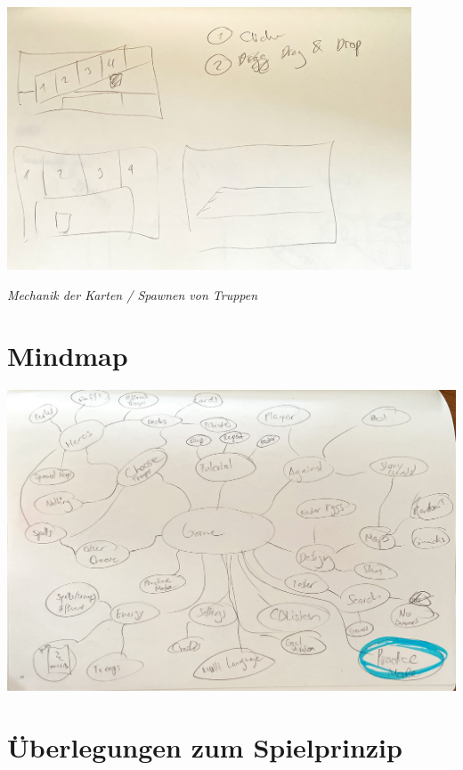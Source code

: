 \begin{center}
    \includegraphics*[width=12cm]{resources/sk_dragndrop.png}
\end{center}
\qquad \quad \enspace \textit{Mechanik der Karten / Spawnen von Truppen}

\section{Mindmap}
\begin{center}
    \includegraphics*[width=14.5cm]{resources/sk_mindmap1.png}
\end{center}


\section{Überlegungen zum Spielprinzip}



